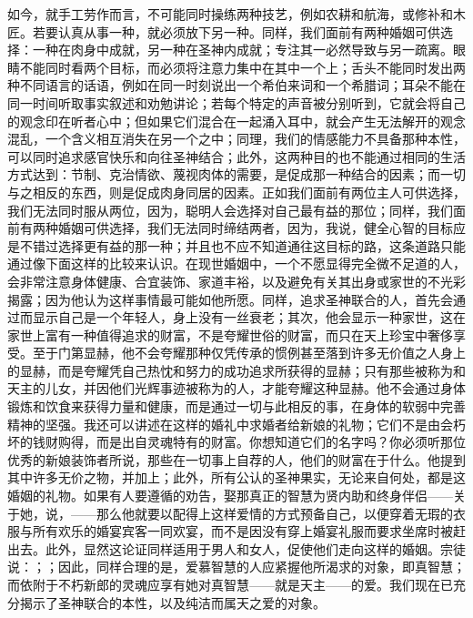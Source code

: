 如今，就手工劳作而言，不可能同时操练两种技艺，例如农耕和航海，或修补和木匠。若要认真从事一种，就必须放下另一种。同样，我们面前有两种婚姻可供选择：一种在肉身中成就，另一种在圣神内成就；专注其一必然导致与另一疏离。眼睛不能同时看两个目标，而必须将注意力集中在其中一个上；舌头不能同时发出两种不同语言的话语，例如在同一时刻说出一个希伯来词和一个希腊词；耳朵不能在同一时间听取事实叙述和劝勉讲论；若每个特定的声音被分别听到，它就会将自己的观念印在听者心中；但如果它们混合在一起涌入耳中，就会产生无法解开的观念混乱，一个含义相互消失在另一个之中；同理，我们的情感能力不具备那种本性，可以同时追求感官快乐和向往圣神结合；此外，这两种目的也不能通过相同的生活方式达到：节制、克治情欲、蔑视肉体的需要，是促成那一种结合的因素；而一切与之相反的东西，则是促成肉身同居的因素。正如我们面前有两位主人可供选择，我们无法同时服从两位，因为，聪明人会选择对自己最有益的那位；同样，我们面前有两种婚姻可供选择，我们无法同时缔结两者，因为，我说，健全心智的目标应是不错过选择更有益的那一种；并且也不应不知道通往这目标的路，这条道路只能通过像下面这样的比较来认识。在现世婚姻中，一个不愿显得完全微不足道的人，会非常注意身体健康、合宜装饰、家道丰裕，以及避免有关其出身或家世的不光彩揭露；因为他认为这样事情最可能如他所愿。同样，追求圣神联合的人，首先会通过而显示自己是一个年轻人，身上没有一丝衰老；其次，他会显示一种家世，这在家世上富有一种值得追求的财富，不是夸耀世俗的财富，而只在天上珍宝中奢侈享受。至于门第显赫，他不会夸耀那种仅凭传承的惯例甚至落到许多无价值之人身上的显赫，而是夸耀凭自己热忱和努力的成功追求所获得的显赫；只有那些被称为和天主的儿女，并因他们光辉事迹被称为的人，才能夸耀这种显赫。他不会通过身体锻炼和饮食来获得力量和健康，而是通过一切与此相反的事，在身体的软弱中完善精神的坚强。我还可以讲述在这样的婚礼中求婚者给新娘的礼物；它们不是由会朽坏的钱财购得，而是出自灵魂特有的财富。你想知道它们的名字吗？你必须听那位优秀的新娘装饰者所说，那些在一切事上自荐的人，他们的财富在于什么。他提到其中许多无价之物，并加上；此外，所有公认的圣神果实，无论来自何处，都是这婚姻的礼物。如果有人要遵循的劝告，娶那真正的智慧为贤内助和终身伴侣——关于她，说，——那么他就要以配得上这样爱情的方式预备自己，以便穿着无瑕的衣服与所有欢乐的婚宴宾客一同欢宴，而不是因没有穿上婚宴礼服而要求坐席时被赶出去。此外，显然这论证同样适用于男人和女人，促使他们走向这样的婚姻。宗徒说：；；因此，同样合理的是，爱慕智慧的人应紧握他所渴求的对象，即真智慧；而依附于不朽新郎的灵魂应享有她对真智慧——就是天主——的爱。我们现在已充分揭示了圣神联合的本性，以及纯洁而属天之爱的对象。\par

